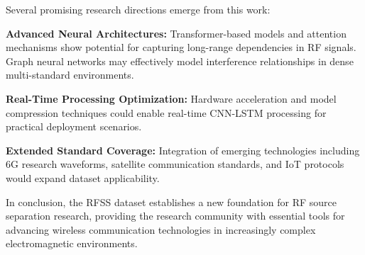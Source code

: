 \documentclass[twocolumn]{article}
\begin{document}
Several promising research directions emerge from this work:

\textbf{Advanced Neural Architectures:} Transformer-based models and attention mechanisms show potential for capturing long-range dependencies in RF signals. Graph neural networks may effectively model interference relationships in dense multi-standard environments.

\textbf{Real-Time Processing Optimization:} Hardware acceleration and model compression techniques could enable real-time CNN-LSTM processing for practical deployment scenarios.

\textbf{Extended Standard Coverage:} Integration of emerging technologies including 6G research waveforms, satellite communication standards, and IoT protocols would expand dataset applicability.

In conclusion, the RFSS dataset establishes a new foundation for RF source separation research, providing the research community with essential tools for advancing wireless communication technologies in increasingly complex electromagnetic environments.



\end{document}
